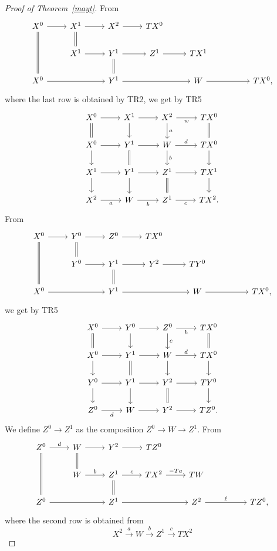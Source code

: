 \documentclass[12pt]{article}%
\theoremstyle{remark}
\theoremstyle{definition}
\begin{document}
\begin{proof}[Proof of Theorem~\ref{mayt}]
From 
$$
\begin{tikzcd}
X^0\ar[equal]{dd}\ar{r}&X^1\ar[equal]{d}\ar{r}&X^2\ar{r}&TX^0\\
&X^1\ar{r}&Y^1\ar[equal]{d}\ar{r}&Z^1\ar{r}&TX^1\\
X^0\ar{rr}&&Y^1\ar{rr}&&W\ar{rr}&&TX^0,
\end{tikzcd}
$$
where the last row is obtained by TR2, we get by TR5
\begin{equation}\label{v1}
\begin{tikzcd}
X^0\ar{r}\ar[equal]{d}&X^1\ar{d}\ar{r}&X^2\ar{d}{a}\ar{r}[swap]{w}&TX^0\ar[equal]{d}\\
X^0\ar{d}\ar{r}&Y^1\ar{r}\ar[equal]{d}&W\ar{d}{b}\ar{r}{d}&TX^0\ar{d}\\
X^1\ar{d}\ar{r}&Y^1\ar{d}\ar{r}&Z^1\ar{r}\ar[equal]{d}&TX^1\ar{d}\\
X^2\ar{r}[swap]{a}&W\ar{r}[swap]{b}&Z^1\ar{r}[swap]{c}&TX^2.
\end{tikzcd}
\end{equation}
%
From 
$$
\begin{tikzcd}
X^0\ar[equal]{dd}\ar{r}&Y^0\ar[equal]{d}\ar{r}&Z^0\ar{r}&TX^0\\
&Y^0\ar{r}&Y^1\ar[equal]{d}\ar{r}&Y^2\ar{r}&TY^0\\
X^0\ar{rr}&&Y^1\ar{rr}&&W\ar{rr}&&TX^0,
\end{tikzcd}
$$
we get by TR5
\begin{equation}\label{v2}
\begin{tikzcd}
X^0\ar{r}\ar[equal]{d}&Y^0\ar{d}\ar{r}&Z^0\ar{d}{e}\ar{r}[swap]{h}&TX^0\ar[equal]{d}\\
X^0\ar{d}\ar{r}&Y^1\ar{r}\ar[equal]{d}&W\ar{d}\ar{r}{d}&TX^0\ar{d}\\
Y^0\ar{d}\ar{r}&Y^1\ar{d}\ar{r}&Y^2\ar{r}\ar[equal]{d}&TY^0\ar{d}\\
Z^0\ar{r}[swap]{d}&W\ar{r}&Y^2\ar{r}&TZ^0.
\end{tikzcd}
\end{equation}
%
We define $Z^0\to Z^1$ as the composition $Z^0\to W\to Z^1$. From 
$$
\begin{tikzcd}
Z^0\ar[equal]{dd}\ar{r}{d}&W\ar[equal]{d}\ar{r}&Y^2\ar{r}&TZ^0\\
&W\ar{r}{b}&Z^1\ar[equal]{d}\ar{r}{c}&TX^2\ar{r}{-Ta}&TW\\
Z^0\ar{rr}&&Z^1\ar{rr}&&Z^2\ar{rr}{\ell}&&TZ^0,
\end{tikzcd}
$$
where the second row is obtained from 
$$
X^2\overset{a}{\to}W\overset{b}{\to}Z^1\overset{c}{\to}TX^2
$$
\end{proof}
\end{document}

